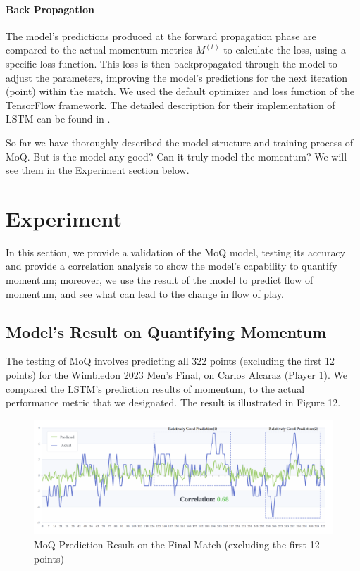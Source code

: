 \documentclass[12pt]{article}  %
\begin{document}
\paragraph{Back Propagation}
The model's predictions produced at the forward propagation phase are compared to the actual momentum metrics $M^{(t)}$ to calculate the loss, using a specific loss function. This loss is then backpropagated through the model to adjust the parameters, improving the model's predictions for the next iteration (point) within the match. We used the default optimizer and loss function of the TensorFlow framework. The detailed description for their implementation of LSTM can be found in \cite{13}.

So far we have thoroughly described the model structure and training process of MoQ. But is the model any good? Can it truly model the momentum? We will see them in the Experiment section below.




\section{Experiment}
In this section, we provide a validation of the MoQ model, testing its accuracy and provide a correlation analysis to show the model's capability to quantify momentum; moreover, we use the result of the model to predict flow of momentum, and see what can lead to the change in flow of play. 

\subsection{Model's Result on Quantifying Momentum}
The testing of MoQ involves predicting all 322 points (excluding the first 12 points) for the Wimbledon 2023 Men's Final, on Carlos Alcaraz (Player 1). We compared the LSTM's prediction results of momentum, to the actual performance metric that we designated. The result is illustrated in Figure 12.

\begin{figure}[htbp]  %
	\centering  %
	\includegraphics[width=\textwidth]{fluctuation.png} %
	\caption{MoQ Prediction Result on the Final Match (excluding the first 12 points)} %
\end{figure}
\vspace{-0.2cm}
\end{document}
